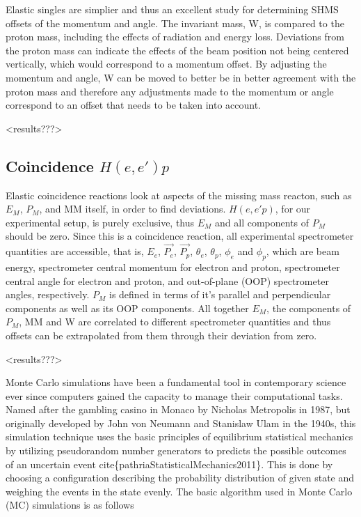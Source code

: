 \documentclass[
]{report}
\begin{document}
Elastic singles are simplier and thus an excellent study for determining
SHMS offsets of the momentum and angle. The invariant mass, W, is
compared to the proton mass, including the effects of radiation and
energy loss. Deviations from the proton mass can indicate the effects of
the beam position not being centered vertically, which would correspond
to a momentum offset. By adjusting the momentum and angle, W can be
moved to better be in better agreement with the proton mass and
therefore any adjustments made to the momentum or angle correspond to an
offset that needs to be taken into account.

\textless results???\textgreater{}

\hypertarget{coincidence-heep}{%
\subsection{\texorpdfstring{Coincidence
\(H(e,e')p\)}{Coincidence H(e,e\textquotesingle)p}}\label{coincidence-heep}}

Elastic coincidence reactions look at aspects of the missing mass
reacton, such as \(E_M\), \(P_M\), and MM itself, in order to find
deviations. \(H(e,e'p)\), for our experimental setup, is purely
exclusive, thus \(E_M\) and all components of \(P_M\) should be zero.
Since this is a coincidence reaction, all experimental spectrometer
quantities are accessible, that is, \(E_e\), \(\vec{P_e}\),
\(\vec{P_p}\), \(\theta_e\), \(\theta_p\), \(\phi_e\) and \(\phi_p\),
which are beam energy, spectrometer central momentum for electron and
proton, spectrometer central angle for electron and proton, and
out-of-plane (OOP) spectrometer angles, respectively. \(P_M\) is defined
in terms of it's parallel and perpendicular components as well as its
OOP components. All together \(E_M\), the components of \(P_M\), MM and
W are correlated to different spectrometer quantities and thus offsets
can be extrapolated from them through their deviation from zero.

\textless results???\textgreater{}

\label{Chapter-6}

Monte Carlo simulations have been a fundamental tool in contemporary
science ever since computers gained the capacity to manage their
computational tasks. Named after the gambling casino in Monaco by
Nicholas Metropolis in 1987, but originally developed by John von
Neumann and Stanislaw Ulam in the 1940s, this simulation technique uses
the basic principles of equilibrium statistical mechanics by utilizing
pseudorandom number generators to predicts the possible outcomes of an
uncertain event cite\{pathriaStatisticalMechanics2011\}. This is done by
choosing a configuration describing the probability distribution of
given state and weighing the events in the state evenly. The basic
algorithm used in Monte Carlo (MC) simulations is as follows
\end{document}
